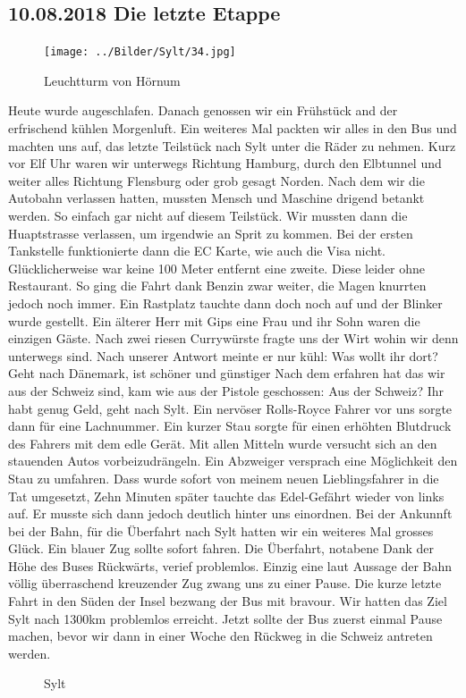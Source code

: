 \subsection{10.08.2018 Die letzte Etappe}

\begin{figure} 
  \begin{centering}
    \texttt{[image: ../Bilder/Sylt/34.jpg]}
    \caption{Leuchtturm von Hörnum}
  \end{centering}
\end{figure} 

Heute wurde augeschlafen.
Danach genossen wir ein Frühstück and der erfrischend kühlen Morgenluft.
Ein weiteres Mal packten wir alles in den Bus und machten uns auf, das letzte Teilstück nach Sylt unter die Räder zu nehmen.
Kurz vor Elf Uhr waren wir unterwegs Richtung Hamburg, durch den Elbtunnel und weiter alles Richtung Flensburg oder grob gesagt Norden.
Nach dem wir die Autobahn verlassen hatten, mussten Mensch und Maschine drigend betankt werden.
So einfach gar nicht auf diesem Teilstück.
Wir mussten dann die Huaptstrasse verlassen, um irgendwie an Sprit zu kommen.
Bei der ersten Tankstelle funktionierte dann die EC Karte, wie auch die Visa nicht.
Glücklicherweise war keine 100 Meter entfernt eine zweite.
Diese leider ohne Restaurant.
So ging die Fahrt dank Benzin zwar weiter, die Magen knurrten jedoch noch immer.
Ein Rastplatz tauchte dann doch noch auf und der Blinker wurde gestellt.
Ein älterer Herr mit Gips eine Frau und ihr Sohn waren die einzigen Gäste.
Nach zwei riesen Currywürste fragte uns der \glqq Wirt\grqq{} wohin wir denn unterwegs sind.
Nach unserer Antwort meinte er nur kühl: \glqq Was wollt ihr dort? Geht nach Dänemark, ist schöner und günstiger\grqq{}
Nach dem erfahren hat das wir aus der Schweiz sind, kam wie aus der Pistole geschossen: \glqq Aus der Schweiz? Ihr habt genug Geld, geht nach Sylt.\grqq{}
Ein nervöser Rolls-Royce Fahrer vor uns sorgte dann für eine Lachnummer.
Ein kurzer Stau sorgte für einen erhöhten Blutdruck des Fahrers mit dem edle Gerät.
Mit allen Mitteln wurde versucht sich an den stauenden Autos vorbeizudrängeln. 
Ein Abzweiger versprach eine Möglichkeit den Stau zu umfahren.
Dass wurde sofort von meinem neuen Lieblingsfahrer in die Tat umgesetzt,
Zehn Minuten später tauchte das Edel-Gefährt wieder von links auf. 
Er musste sich dann jedoch deutlich hinter uns einordnen.
Bei der Ankunnft bei der Bahn, für die Überfahrt nach Sylt hatten wir ein weiteres Mal grosses Glück.
Ein blauer Zug sollte sofort fahren.
Die Überfahrt, notabene Dank der Höhe des Buses Rückwärts, verief problemlos.
Einzig eine laut Aussage der Bahn völlig überraschend kreuzender Zug zwang uns zu einer Pause.
Die kurze letzte Fahrt in den Süden der Insel bezwang der Bus mit bravour.
Wir hatten das Ziel Sylt nach 1300km problemlos erreicht.
Jetzt sollte der Bus zuerst einmal Pause machen, bevor wir dann in einer Woche den Rückweg in die Schweiz antreten werden.

\begin{figure}[b]
   \centering
   \quad
   \quad
   \quad
   \caption[Sylt]{Sylt}
\end{figure}

